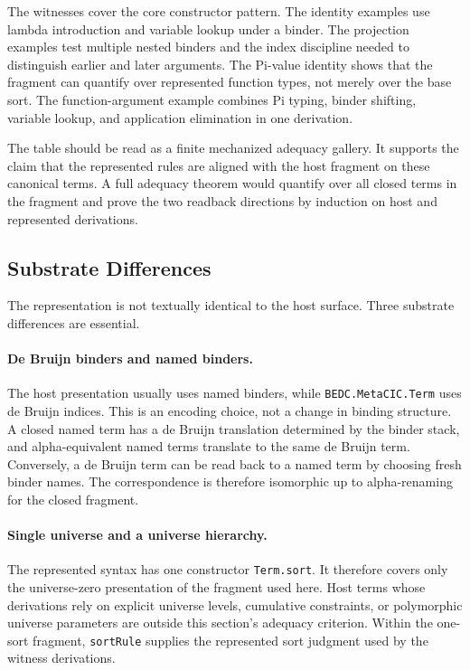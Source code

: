 
The witnesses cover the core constructor pattern. The identity examples use
lambda introduction and variable lookup under a binder. The projection
examples test multiple nested binders and the index discipline needed to
distinguish earlier and later arguments. The Pi-value identity shows that the
fragment can quantify over represented function types, not merely over the
base sort. The function-argument example combines Pi typing, binder shifting,
variable lookup, and application elimination in one derivation.

The table should be read as a finite mechanized adequacy gallery. It supports
the claim that the represented rules are aligned with the host fragment on
these canonical terms. A full adequacy theorem would quantify over all closed
terms in the fragment and prove the two readback directions by induction on
host and represented derivations.

\subsection{Substrate Differences}
\label{subsec:metacic-substrate-differences}

The representation is not textually identical to the host surface. Three
substrate differences are essential.

\paragraph{De Bruijn binders and named binders.}
The host presentation usually uses named binders, while
\texttt{BEDC.MetaCIC.Term} uses de Bruijn indices. This is an encoding choice,
not a change in binding structure. A closed named term has a de Bruijn
translation determined by the binder stack, and alpha-equivalent named terms
translate to the same de Bruijn term. Conversely, a de Bruijn term can be read
back to a named term by choosing fresh binder names. The correspondence is
therefore isomorphic up to alpha-renaming for the closed fragment.

\paragraph{Single universe and a universe hierarchy.}
The represented syntax has one constructor \texttt{Term.sort}. It therefore
covers only the universe-zero presentation of the fragment used here. Host
terms whose derivations rely on explicit universe levels, cumulative
constraints, or polymorphic universe parameters are outside this section's
adequacy criterion. Within the one-sort fragment, \texttt{sortRule} supplies
the represented sort judgment used by the witness derivations.


